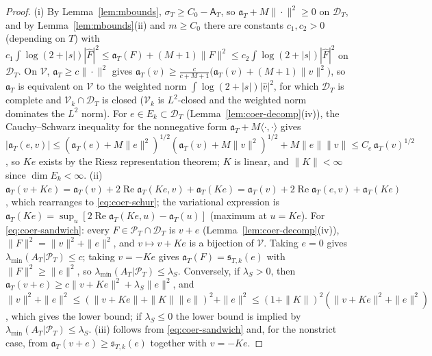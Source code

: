 \documentclass[11pt]{amsart}
\theoremstyle{definition}
\theoremstyle{remark}
\newcommand{\Rel}{\operatorname{Re}}
\newcommand{\PT}{\mathcal P_T}
\newcommand{\lamA}{\lambda_{\min}(A_T|\PT)}
\newcommand{\Fh}{\widehat F}
\newcommand{\Aconst}{\mathsf A_T}
\begin{document}
\begin{proof}
(i) By Lemma~\ref{lem:mbounds}, $\sigma_T\ge C_0-\Aconst$, so $\mathfrak a_T+M\|\cdot\|^2\ge0$ on $\mathcal D_T$, and
by Lemma~\ref{lem:mbounds}(ii) and $m\ge C_0$ there are constants $c_1,c_2>0$ (depending on $T$) with
$c_1\int\log(2+|s|)|\Fh|^2\le\mathfrak a_T(F)+(M+1)\|F\|^2\le c_2\int\log(2+|s|)|\Fh|^2$ on $\mathcal D_T$. On $\mathcal V$,
$\mathfrak a_T\ge c\|\cdot\|^2$ gives $\mathfrak a_T(v)\ge\frac c{c+M+1}\big(\mathfrak a_T(v)+(M+1)\|v\|^2\big)$, so
$\mathfrak a_T$ is equivalent on $\mathcal V$ to the weighted norm $\int\log(2+|s|)|\widehat v|^2$, for which
$\mathcal D_T$ is complete and $\mathcal V_k\cap\mathcal D_T$ is closed ($\mathcal V_k$ is $L^2$-closed and the weighted norm
dominates the $L^2$ norm). For $e\in E_k\subset\mathcal D_T$ (Lemma~\ref{lem:coer-decomp}(iv)), the Cauchy--Schwarz
inequality for the nonnegative form $\mathfrak a_T+M\langle\cdot,\cdot\rangle$ gives
$|\mathfrak a_T(e,v)|\le(\mathfrak a_T(e)+M\|e\|^2)^{1/2}(\mathfrak a_T(v)+M\|v\|^2)^{1/2}+M\|e\|\|v\|\le C_e\,\mathfrak a_T(v)^{1/2}$,
so $Ke$ exists by the Riesz representation theorem; $K$ is linear, and $\|K\|<\infty$ since $\dim E_k<\infty$.
(ii) $\mathfrak a_T(v+Ke)=\mathfrak a_T(v)+2\Rel\mathfrak a_T(Ke,v)+\mathfrak a_T(Ke)=\mathfrak a_T(v)+2\Rel\mathfrak a_T(e,v)+\mathfrak a_T(Ke)$,
which rearranges to \eqref{eq:coer-schur}; the variational expression is $\mathfrak a_T(Ke)=\sup_u[2\Rel\mathfrak a_T(Ke,u)-\mathfrak a_T(u)]$
(maximum at $u=Ke$). For \eqref{eq:coer-sandwich}: every $F\in\PT\cap\mathcal D_T$ is $v+e$ (Lemma~\ref{lem:coer-decomp}(iv)),
$\|F\|^2=\|v\|^2+\|e\|^2$, and $v\mapsto v+Ke$ is a bijection of $\mathcal V$. Taking $e=0$ gives $\lamA\le c$; taking
$v=-Ke$ gives $\mathfrak a_T(F)=\mathfrak s_{T,k}(e)$ with $\|F\|^2\ge\|e\|^2$, so $\lamA\le\lambda_S$. Conversely, if
$\lambda_S>0$, then $\mathfrak a_T(v+e)\ge c\|v+Ke\|^2+\lambda_S\|e\|^2$, and
$\|v\|^2+\|e\|^2\le(\|v+Ke\|+\|K\|\|e\|)^2+\|e\|^2\le(1+\|K\|)^2(\|v+Ke\|^2+\|e\|^2)$, which gives the lower bound; if
$\lambda_S\le0$ the lower bound is implied by $\lamA\le\lambda_S$. (iii) follows from \eqref{eq:coer-sandwich}
and, for the nonstrict case, from $\mathfrak a_T(v+e)\ge\mathfrak s_{T,k}(e)$ together with $v=-Ke$.
\end{proof}
\end{document}

